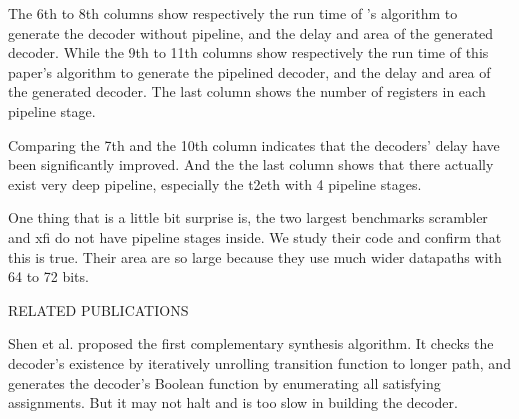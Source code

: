 \documentclass[twocolumn]{article}
\makeatletter
\def\section{\@startsection {section}{1}{\z@}{20pt plus 2pt minus 2pt}
{8pt plus 2pt minus 2pt}{\centering\normalsize\sc
\edef\@svsec{\thesection.\ }}}
\def\thesection{\Roman{section}}
\def\subsection{\@startsection {subsection}{2}{\z@}{16pt plus 2pt minus 2pt}
{6pt plus 2pt minus 2pt}{\normalsize\sl
\edef\@svsec{\thesubsection.\ }}}
\def\thesubsection{\Alph{subsection}}
\makeatother
\begin{document}
The 6th to 8th columns show respectively the run time of \cite{ShenTCAD11}'s algorithm to generate the decoder without pipeline,
and the delay and area of the generated decoder.
While the 9th to 11th columns show respectively the run time of this paper's algorithm to generate the pipelined decoder,
and the delay and area of the generated decoder.
The last column shows the number of registers in each pipeline stage.

Comparing the 7th and the 10th column indicates that
the decoders' delay have been significantly improved.
And the the last column shows that there actually exist very deep pipeline,
especially the t2eth with 4 pipeline stages.

One thing that is a little bit surprise is,
the two largest benchmarks scrambler and xfi do not have pipeline stages inside.
We study their code and confirm that this is true.
Their area are so large because they use much wider datapaths with 64 to 72 bits.

\section{RELATED PUBLICATIONS}\label{sec_relwork}
%
%

Shen et al.\cite{ShenICCAD09} proposed the first complementary synthesis algorithm.
It checks the decoder's existence by iteratively unrolling transition function to longer path,
and generates the decoder's Boolean function by enumerating all satisfying assignments.
But it may not halt and is too slow in building the decoder.
\end{document}
